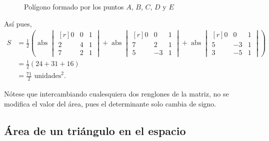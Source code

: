 \begin{example}
\begin{figure}[h!]
        \caption{Polígono formado por los puntos $A$, $B$, $C$, $D$ y $E$}
    \end{figure}
    Así pues,
    \begin{align*}
        S &=\frac{1}{2} \left( \operatorname{abs} \begin{vmatrix*}[r]
        0 & 0 & 1 \\
        2 & 4 & 1 \\
        7 & 2 & 1
        \end{vmatrix*} + \operatorname{abs} \begin{vmatrix*}[r]
        0 & 0 & 1 \\
        7 & 2 & 1 \\
        5 & -3 & 1
        \end{vmatrix*} + \operatorname{abs} \begin{vmatrix*}[r]
        0 & 0 & 1 \\
        5 & -3 & 1 \\
        3 & -5 & 1
        \end{vmatrix*} \right) \\
        &=\frac{1}{2} (24+31+16) \\
        &=\frac{71}{2} \text{ unidades}^2.
    \end{align*}
\end{example}

\begin{observation}
    Nótese que intercambiando cualesquiera dos renglones de la matriz, no se modifica el valor del área, pues el determinante solo cambia de signo.
\end{observation}

\subsection{Área de un triángulo en el espacio}


